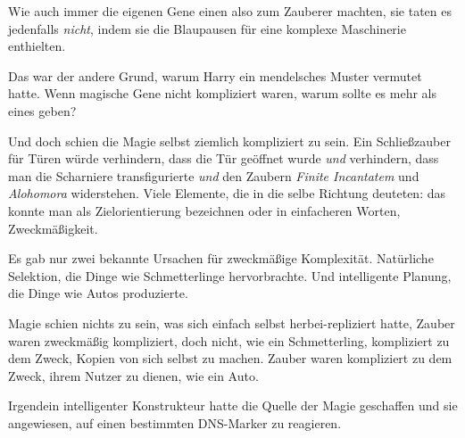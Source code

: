 Wie auch immer die eigenen Gene einen also zum Zauberer machten, sie taten es jedenfalls \emph{nicht}, indem sie die Blaupausen für eine komplexe Maschinerie enthielten.

Das war der andere Grund, warum Harry ein mendelsches Muster vermutet hatte. Wenn magische Gene nicht kompliziert waren, warum sollte es mehr als eines geben?

Und doch schien die Magie selbst ziemlich kompliziert zu sein. Ein Schließzauber für Türen würde verhindern, dass die Tür geöffnet wurde \emph{und} verhindern, dass man die Scharniere transfigurierte \emph{und} den Zaubern \emph{Finite Incantatem} und \emph{Alohomora} widerstehen. Viele Elemente, die in die selbe Richtung deuteten: das konnte man als Zielorientierung bezeichnen oder in einfacheren Worten, Zweckmäßigkeit.

Es gab nur zwei bekannte Ursachen für zweckmäßige Komplexität. Natürliche Selektion, die Dinge wie Schmetterlinge hervorbrachte. Und intelligente Planung, die Dinge wie Autos produzierte.

Magie schien nichts zu sein, was sich einfach selbst herbei-repliziert hatte, Zauber waren zweckmäßig kompliziert, doch nicht, wie ein Schmetterling, kompliziert zu dem Zweck, Kopien von sich selbst zu machen. Zauber waren kompliziert zu dem Zweck, ihrem Nutzer zu dienen, wie ein Auto.

Irgendein intelligenter Konstrukteur hatte die Quelle der Magie geschaffen und sie angewiesen, auf einen bestimmten DNS-Marker zu reagieren.

